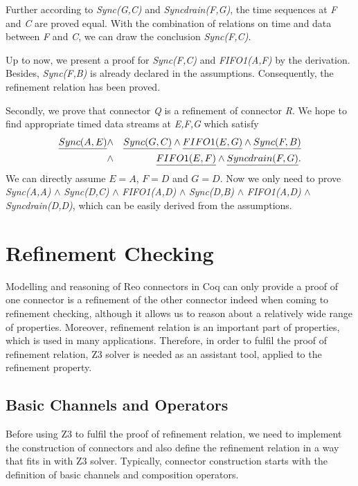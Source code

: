 \documentclass{llncs}
\begin{document}
\begin{example}[Equivalence]
Further according to \emph{Sync(G,C)} and \emph{Syncdrain(F,G)}, the time sequences at \emph{F} and \emph{C} are proved equal. With the combination of relations on time and data between \emph{F} and \emph{C}, we can draw the conclusion \emph{Sync(F,C)}.


Up to now, we present a proof for \emph{Sync(F,C)} and \emph{FIFO1(A,F)} by the derivation. Besides, \emph{Sync(F,B)} is already declared in the assumptions. Consequently, the refinement relation has been proved.

Secondly, we prove that connector \emph{Q} is a refinement of connector \emph{R}.
We hope to find appropriate timed data streams at \emph{E,F,G}  which satisfy
\begin{eqnarray*}
\emph{Sync(A,E)}&\wedge& \emph{Sync(G,C)} \wedge \emph{FIFO1(E,G)}\wedge \emph{Sync(F,B)}\\
 &\wedge& \emph{FIFO1(E,F)}\wedge \emph{Syncdrain(F,G)}.
\end{eqnarray*}
We can directly assume $E=A$, $F=D$ and $G=D$. Now we only need to prove
\emph{Sync(A,A)} $\wedge$  \emph{Sync(D,C)}  $\wedge$  \emph{FIFO1(A,D)} $\wedge$  \emph{Sync(D,B)} $\wedge$ \emph{FIFO1(A,D)} $\wedge$ \emph{Syncdrain(D,D)}, which can be easily derived from the assumptions.
\end{example}

\section{Refinement Checking} \label{sec:refinement}
Modelling and reasoning of Reo connectors in Coq can only provide a proof of one connector is a refinement of the other connector indeed when coming to refinement checking, although it allows us to reason about a relatively wide range of properties. Moreover, refinement relation is an important part of properties, which is used in many applications. Therefore, in order to fulfil the proof of refinement relation, Z3 solver is needed as an assistant tool, applied to the refinement property.
\subsection{Basic Channels and Operators}
Before using Z3 to fulfil the proof of refinement relation, we need to implement the construction of connectors and also define the refinement relation in a way that fits in with Z3 solver. Typically, connector construction starts with the definition of basic channels and composition operators.
\end{document}

